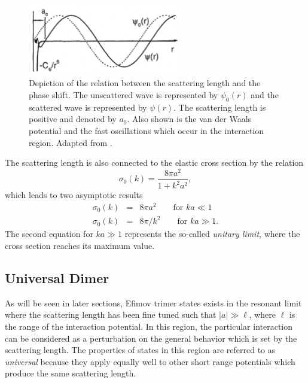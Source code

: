 \documentclass[prl,onecolumn,amsmath,amssymb,titlepage,nofootinbib,preprint]{revtex4-1}
\begin{document}
		\begin{figure}
			\includegraphics[width=0.6\textwidth]{Figures/scattering_length_with_C6}
			\caption{Depiction of the relation between the scattering length and the phase shift.  The unscattered wave is represented by $\psi_{0}(r)$ and the scattered wave is represented by $\psi(r)$.  The scattering length is positive and denoted by $a_{0}$.  Also shown is the van der Waals potential and the fast oscillations which occur in the interaction region.  Adapted from \cite{Chin2001}.}
			\label{fig:scattering_length}
		\end{figure}
		
	The scattering length is also connected to the elastic cross section by the relation \cite{Dalibard1999}
	\begin{equation}\label{eq:cross_section}
		\sigma_{0}(k)=\frac{8\pi a^{2}}{1+k^{2}a^{2}},
	\end{equation}
	which leads to two asymptotic results
	\begin{eqnarray}
			\sigma_{0}(k) & = & 8\pi a^{2} \qquad \text{for } ka\ll 1\\
			\sigma_{0}(k) & = & 8\pi/k^{2} \qquad \text{for } ka\gg 1.
	\end{eqnarray}
	The second equation for $ka\gg 1$ represents the so-called \textit{unitary limit}, where the cross section reaches its maximum value.
	
	\subsection{Universal Dimer}
	As will be seen in later sections, Efimov trimer states exists in the resonant limit where the scattering length has been fine tuned such that $|a|\gg\ell$, where $\ell$ is the range of the interaction potential.  In this region, the particular  interaction can be considered as a perturbation on the general behavior which is set by the scattering length.  The properties of states in this region are referred to as \textit{universal} because they apply equally well to other short range potentials which produce the same scattering length.
	
\end{document}
